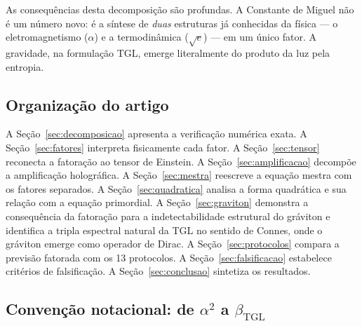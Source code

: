 \documentclass[12pt,a4paper,twoside]{article}
\newcommand{\betatgl}{\beta_{\!\scriptscriptstyle\mathrm{TGL}}}
\begin{document}
As consequências desta decomposição são profundas. A Constante de Miguel não é um número novo: é a síntese de \textit{duas} estruturas já conhecidas da física --- o eletromagnetismo ($\alpha$) e a termodinâmica ($\sqrt{e}$) --- em um único fator. A gravidade, na formulação TGL, emerge literalmente do produto da luz pela entropia.

\subsection{Organização do artigo}

A Seção~\ref{sec:decomposicao} apresenta a verificação numérica exata. A Seção~\ref{sec:fatores} interpreta fisicamente cada fator. A Seção~\ref{sec:tensor} reconecta a fatoração ao tensor de Einstein. A Seção~\ref{sec:amplificacao} decompõe a amplificação holográfica. A Seção~\ref{sec:mestra} reescreve a equação mestra com os fatores separados. A Seção~\ref{sec:quadratica} analisa a forma quadrática e sua relação com a equação primordial. A Seção~\ref{sec:graviton} demonstra a consequência da fatoração para a indetectabilidade estrutural do gráviton e identifica a tripla espectral natural da TGL no sentido de Connes, onde o gráviton emerge como operador de Dirac. A Seção~\ref{sec:protocolos} compara a previsão fatorada com os 13 protocolos. A Seção~\ref{sec:falsificacao} estabelece critérios de falsificação. A Seção~\ref{sec:conclusao} sintetiza os resultados.


\subsection{Convenção notacional: de $\alpha^2$ a $\betatgl$}
\label{sec:convencao}
\end{document}
